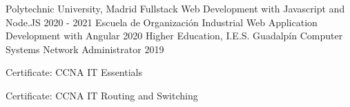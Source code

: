
\begin{cventries}
    \cventry
    {Polytechnic University, Madrid}
    {Fullstack Web Development with Javascript and Node.JS}
    {}
    {2020 - 2021}
    {}
    \vspace{-0.5em}
    \cventry
    {Escuela de Organización Industrial}
    {Web Application Development with Angular}
    {}
    {2020}
    {}
    \vspace{-0.5em}
    \cventry
    {Higher Education, I.E.S. Guadalpín}
    {Computer Systems Network Administrator}
    {}
    {2019}
    {
        \begin{cvitems}
            \item{Certificate: CCNA IT Essentials}
            \item{Certificate: CCNA IT Routing and Switching}            
        \end{cvitems}
    }
\end{cventries}
